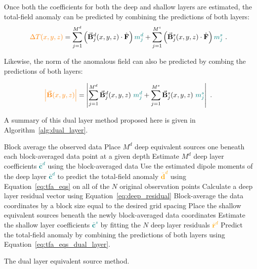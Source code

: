 Once both the coefficients for both the deep and shallow layers are estimated, the total-field anomaly can be predicted by combining the predictions of both layers:
\begin{equation}
    \label{eq:tfa_eqs_dual_layer}
  \textcolor{orange}{\Delta T (x, y, z)} = \sum_{j=1}^{M^d} \left(\vec{\mathbf{B}}^d_j(x, y, z) \cdot \hat{\mathbf{F}}\right) \textcolor{teal}{m_j^d}
  +  \sum_{j=1}^{M^s} \left(\vec{\mathbf{B}}^s_j(x, y, z) \cdot \hat{\mathbf{F}}\right) \textcolor{teal}{m_j^s}
  \ .
\end{equation}

\noindent
Likewise, the norm of the anomalous field can also be predicted by combing the predictions of both layers:

\begin{equation}
  \textcolor{orange}{\left\lvert \vec{\mathbf{B}}(x,y,z) \right\rvert} = 
  \left\lvert \sum_{j=1}^{M^d} \vec{\mathbf{B}}^d_{j}(x,y,z)\ \textcolor{teal}{m^d_j}
  +
  \sum_{j=1}^{M^s}  \vec{\mathbf{B}}^s_{j}(x,y,z)\ \textcolor{teal}{m^s_j}
  \right\rvert
  \ .
\end{equation}

A summary of this dual layer method proposed here is given in Algorithm~\ref{alg:dual_layer}.

\begin{algorithm}[!h]
  Block average the observed data
  \;
  Place $M^d$ deep equivalent sources one beneath each block-averaged data point at a given depth
  \;
  Estimate $M^d$ deep layer coefficients \textcolor{teal}{$\bar{\mathbf{c}}^d$} using the block-averaged data 
  \;
  Use the estimated dipole moments of the deep layer \textcolor{teal}{$\bar{\mathbf{c}}^d$} to predict the total-field anomaly \textcolor{orange}{$\bar{\mathbf{d}}^d$} using Equation~\ref{eq:tfa_eqs} on all of the $N$ original observation points
  \;
  Calculate a deep layer residual vector using Equation~\ref{eq:deep_residual}
  \;
  Block-average the data coordinates by a block size equal to the desired grid spacing
  \;
  Place the shallow equivalent sources beneath the newly block-averaged data coordinates
  \;
  Estimate the shallow layer coefficients \textcolor{teal}{$\bar{\mathbf{c}}^s$} by fitting the $N$ deep layer residuals \textcolor{orange}{$\bar{\mathbf{r}}^d$}
  \;
   Predict the total-field anomaly by combining the predictions of both layers using Equation~\ref{eq:tfa_eqs_dual_layer}.
  \BlankLine
  \caption{The dual layer equivalent source method.}
  \label{alg:dual_layer}
\end{algorithm}


